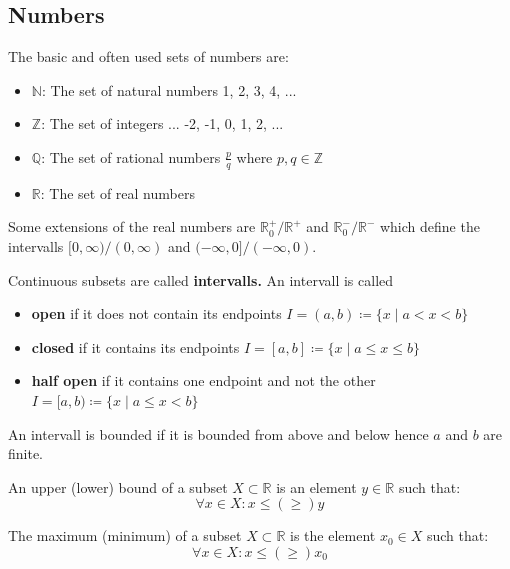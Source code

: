 \subsection{Numbers}

The basic and often used sets of numbers are:

\begin{itemize}
    \item $\mathbb{N}$: The set of natural numbers 1, 2, 3, 4, ...
    \item $\mathbb{Z}$: The set of integers ... -2, -1, 0, 1, 2, ...
    \item $\mathbb{Q}$: The set of rational numbers $\frac{p}{q}$ where $p, q \in \mathbb{Z}$
    \item $\mathbb{R}$: The set of real numbers
\end{itemize}

\begin{remark}
Some extensions of the real numbers are $\mathbb{R}^{+}_{0} / \mathbb{R}^{+}$ and $\mathbb{R}^{-}_{0} / \mathbb{R}^{-}$ which define the intervalls $[0, \infty) / (0, \infty)$ and $(-\infty, 0] / (-\infty, 0)$.
\end{remark}

\begin{definition}
Continuous subsets are called \textbf{intervalls.} An intervall is called
\begin{itemize}
    \item \textbf{open} if it does not contain its endpoints $I = (a, b) \coloneqq \{x \mid a \lt x \lt b\}$
    \item \textbf{closed} if it contains its endpoints $I = [a, b] \coloneqq \{x \mid a \leq x \leq b\}$
    \item \textbf{half open} if it contains one endpoint and not the other $I = [a, b) \coloneqq \{x \mid a \leq x \lt b\}$
\end{itemize}
An intervall is bounded if it is bounded from above and below hence $a$ and $b$ are finite.
\end{definition}

\begin{definition}
An upper (lower) bound of a subset $X \subset \mathbb{R}$ is an element $y \in \mathbb{R}$ such that:
$$\forall x \in X: x \leq (\geq) y$$

The maximum (minimum) of a subset $X \subset \mathbb{R}$ is the element $x_{0} \in X$ such that:
$$\forall x \in X: x \leq (\geq) x_{0}$$
\end{definition}

